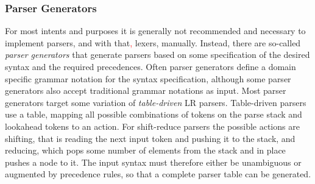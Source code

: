 \subsubsection{Parser Generators}\label{sec:parser_generators}

For most intents and purposes it is generally not recommended and necessary to implement parsers, and with that\textcolor{red}{,} lexers, manually.
Instead, there are so-called \emph{parser generators} that generate parsers based on some specification of the desired syntax and the required precedences.
Often parser generators define a domain specific grammar notation for the syntax specification, although some parser generators also accept traditional grammar notations as input.
Most parser generators target some variation of \emph{table-driven} LR parsers.
Table-driven parsers use a table, mapping all possible combinations of tokens on the parse stack and lookahead tokens to an action.
For shift-reduce parsers the possible actions are shifting, that is reading the next input token and pushing it to the stack, and reducing, which pops some number of elements from the stack and in place pushes a node to it.
The input syntax must therefore either be unambiguous or augmented by precedence rules, so that a complete parser table can be generated.
